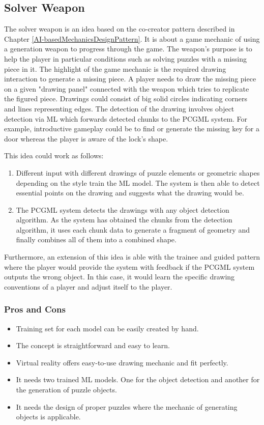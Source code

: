 \documentclass[MGS,Master,english]{twbook}%
\begin{document}
\subsection{Solver Weapon} \label{idea::solverWeapon}
The solver weapon is an idea based on the co-creator pattern described in Chapter \ref{AI-basedMechanicsDesignPattern}. It is about a game mechanic of using a generation weapon to progress through the game. The weapon's purpose is to help the player in particular conditions such as solving puzzles with a missing piece in it. The highlight of the game mechanic is the required drawing interaction to generate a missing piece. A player needs to draw the missing piece on a given "drawing panel" connected with the weapon which tries to replicate the figured piece. Drawings could consist of big solid circles indicating corners and lines representing edges. The detection of the drawing involves object detection via \ac{ML} which forwards detected chunks to the \ac{PCGML} system. For example, introductive gameplay could be to find or generate the missing key for a door whereas the player is aware of the lock's shape.

This idea could work as follows: 
\begin{enumerate}
	\item Different input with different drawings of puzzle elements or geometric shapes depending on the style train the \ac{ML} model. The system is then able to detect essential points on the drawing and suggests what the drawing would be.
	\item The \ac{PCGML} system detects the drawings with any object detection algorithm. As the system has obtained the chunks from the detection algorithm, it uses each chunk data to generate a fragment of geometry and finally combines all of them into a combined shape.
\end{enumerate}

Furthermore, an extension of this idea is able with the trainee and guided pattern where the player would provide the system with feedback if the \ac{PCGML} system outputs the wrong object. In this case, it would learn the specific drawing conventions of a player and adjust itself to the player.

\subsubsection{Pros and Cons}
\begin{itemize}
	\item Training set for each model can be easily created by hand.
	\item The concept is straightforward and easy to learn.
	\item Virtual reality offers easy-to-use drawing mechanic and fit perfectly.
	\item It needs two trained \ac{ML} models. One for the object detection and another for the generation of puzzle objects. 
	\item It needs the design of proper puzzles where the mechanic of generating objects is applicable.
\end{itemize}
\end{document}
